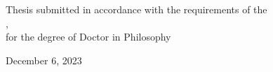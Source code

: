 \begin{titlepage}
\begin{center}
\vspace{1.5cm}

\vfill

\large {Thesis submitted in accordance with the requirements of the\\}
\univname, \deptname \\
\large {for the degree of Doctor in Philosophy}

\vfill

{\large December 6, 2023}\\[4.5cm] %

\vfill
\end{center}
\end{titlepage}